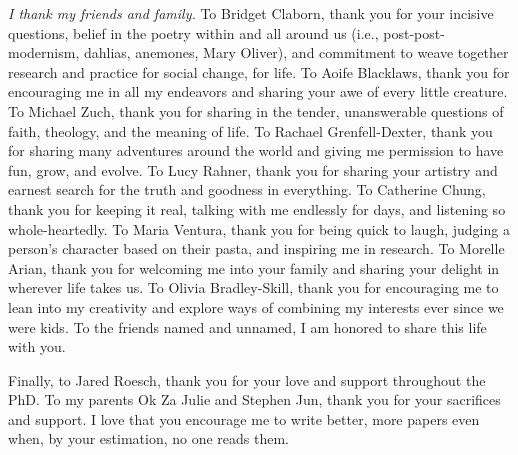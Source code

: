 \textit{I thank my friends and family.} To Bridget Claborn, thank you for your
incisive questions, belief in the poetry within and all around us (i.e.,
post-post-modernism, dahlias, anemones, Mary Oliver), and commitment to weave
together research and practice for social change, for life.
To Aoife Blacklaws, thank you for encouraging me in all my endeavors and sharing
your awe of every little creature. To Michael Zuch, thank you for sharing in the
tender, unanswerable questions of faith, theology, and the meaning of life. To Rachael
Grenfell-Dexter, thank you for sharing many adventures around the world and giving me permission to have fun, grow, and evolve. 
To Lucy Rahner, thank you for sharing your artistry and earnest search for the truth and
goodness in everything. To Catherine Chung, thank you for keeping it real,
talking with me endlessly for days, and listening so whole-heartedly. 
To Maria Ventura, thank you for being quick to laugh, judging a person's character based on their pasta, and inspiring me in research.
To Morelle Arian, thank you for welcoming me into your family and sharing your delight in wherever life takes us. 
To Olivia Bradley-Skill, thank you for encouraging me to lean into my creativity and explore ways of combining my interests ever since we were kids.
To the friends named and unnamed, I am honored to share this life with you. 

Finally, to Jared Roesch, thank you for your love and support throughout the PhD.
To my parents Ok Za Julie and Stephen Jun,
thank you for your sacrifices and support. I love that you
encourage me to write better, more papers even when, by your estimation,
no one reads them.





